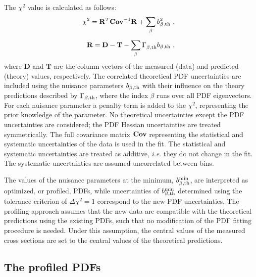 \documentclass[pdftex,twocolumn,epjc3]{svjour3}          %
\newcommand{\chisq}{\ensuremath{\chi^2}\xspace}
\begin{document}
The \chisq value is calculated as follows:
\begin{equation}
\begin{split}
  \chisq = \mathbf{R}^{T}_{} \mathbf{Cov}^{-1}_{} \mathbf{R}_{} + \sum_{\beta} b_{\beta,\rm th}^2 \ , \\[5pt]
  \mathbf{R} = \mathbf{D} - \mathbf{T} - \sum_{\beta} \Gamma^{}_{\beta,\rm th} b_{\beta,\rm th} \ ,
\label{eq:chisq}
\end{split}
\end{equation}
%
where $\mathbf{D}$ and $\mathbf{T}$ are the column vectors of the
measured (data) and predicted (theory) values, respectively.  The
correlated theoretical PDF uncertainties are included using the
nuisance parameters $b_{\beta, \rm th}$ with their influence on the
theory predictions described by $\Gamma_{\beta,\rm th}$, where the
index $\beta$ runs over all PDF eigenvectors. For each nuisance
parameter a penalty term is added to the \chisq, representing the
prior knowledge of the parameter.
%
No theoretical uncertainties except
the PDF uncertainties are considered; the PDF Hessian uncertainties are treated symmetrically.
%
The full covariance matrix ${\bf Cov }$
representing the statistical and systematic uncertainties of the data
is used in the fit. The statistical and systematic uncertainties are
treated as additive, \textit{i.e.} they do not change in the fit.
%
The systematic uncertainties are assumed uncorrelated between bins.


The values of the nuisance parameters at the minimum,
$b^{\rm min}_{\beta,\rm th}$, are interpreted as optimized, or
profiled, PDFs, while  uncertainties of $b^{\rm min}_{\beta,\rm th}$   determined using the
tolerance criterion of $\Delta\chi^2 = 1$ correspond to the new PDF
uncertainties. The profiling approach assumes that the new data are
compatible with the theoretical predictions using the existing PDFs,
such that no modification of the PDF fitting procedure is
needed. Under this assumption, the central values of the measured
cross sections are set to the central values of the theoretical
predictions.


%
\subsection{The profiled PDFs}
\label{sec:profile}
\end{document}
